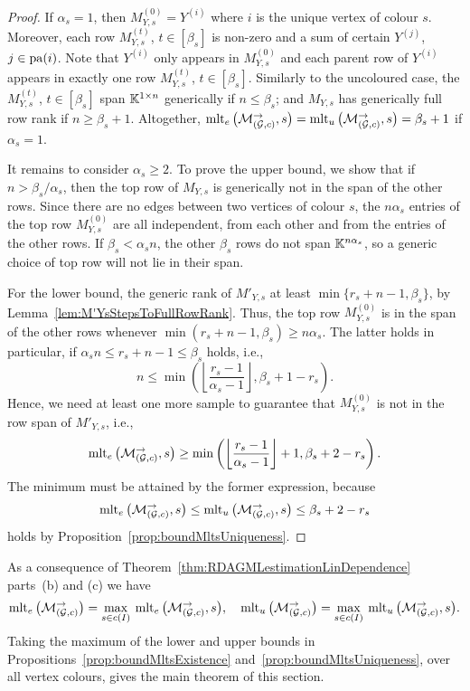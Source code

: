 \begin{proof}
	If $\alpha_s = 1$, then $M_{Y,s}^{(0)} = Y^{(i)}$ where $i$ is the unique vertex of colour $s$. Moreover, each row $M_{Y,s}^{(t)}$, $t \in [\beta_s]$ is non-zero and a sum of certain $Y^{(j)}$, $j \in \operatorname{pa}(i)$. Note that $Y^{(i)}$ only appears in $M_{Y,s}^{(0)}$ and each parent row of $Y^{(i)}$ appears in exactly one row $M_{Y,s}^{(t)}$, $t \in [\beta_s]$. Similarly to the uncoloured case, the $M_{Y,s}^{(t)}$, $t \in [\beta_s]$ span $\mathbb K^{1 \times n}$ generically if $n \leq \beta_s$; and $M_{Y,s}$ has generically full row rank if $n \geq \beta_s +1$. Altogether, $\operatorname{mlt}_e \big(\mathcal{M}_{(\mathcal{G}, c)}^{\to}, s \big) = \operatorname{mlt}_u \big(\mathcal{M}_{(\mathcal{G}, c)}^{\to}, s \big) = \beta_s + 1$ if $\alpha_s = 1$.
	
	It remains to consider $\alpha_s \geq 2$.
	To prove the upper bound, we show that if $n > \beta_s / \alpha_s$, then the top row of $M_{Y,s}$ is generically not in the span of the other rows. Since there are no edges between two vertices of colour $s$, the $n \alpha_s$ entries of the top row $M_{Y,s}^{(0)}$ are all independent, from each other and from the entries of the other rows. If $\beta_s < \alpha_s n$, the other $\beta_s$ rows do not span $\mathbb K^{n \alpha_s}$, so a generic choice of top row will not lie in their span. 
	
	For the lower bound, the generic rank of $M'_{Y,s}$ at least $ \min \{ r_s + n -1 , \beta_s \}$, by Lemma~\ref{lem:M'YsStepsToFullRowRank}. Thus, the top row $M^{(0)}_{Y,s}$ is in the span of the other rows whenever 
	$\min(r_s + n -1, \beta_s) \geq n \alpha_s$. The latter holds in particular, if $\alpha_s n \leq r_s + n - 1 \leq \beta_s$ holds, i.e.,
		\[n \leq \min \left( \left\lfloor\frac{r_s-1}{\alpha_s-1}\right\rfloor , \beta_s + 1 - r_s \right) .	\]
	Hence, we need at least one more sample to guarantee that $M^{(0)}_{Y,s}$ is not in the row span of $M'_{Y,s}$, i.e.,
		\[\operatorname{mlt}_e \big( \mathcal{M}_{(\mathcal{G}, c)}^{\to}, s \big) \geq \min \left( \left\lfloor\frac{r_s-1}{\alpha_s-1}\right\rfloor + 1 , \beta_s + 2 - r_s \right).\]
	The minimum must be attained by the former expression, because
		\[ \operatorname{mlt}_e \big( \mathcal{M}_{(\mathcal{G}, c)}^{\to}, s \big) \leq \operatorname{mlt}_u \big( \mathcal{M}_{(\mathcal{G}, c)}^{\to}, s \big) \leq \beta_s + 2 - r_s \]
	holds by Proposition~\ref{prop:boundMltsUniqueness}.
\end{proof}


As a consequence of Theorem~\ref{thm:RDAGMLestimationLinDependence} parts~(b) and (c) we have
	\[ \operatorname{mlt}_e \big(\mathcal{M}_{(\mathcal{G}, c)}^{\to} \big) = \max_{s \in c(I)} \: \operatorname{mlt}_e \big( \mathcal{M}_{(\mathcal{G}, c)}^{\to}, s \big)
		, \quad
		\operatorname{mlt}_u \big(\mathcal{M}_{(\mathcal{G}, c)}^{\to} \big) = \max_{s \in c(I)} \: \operatorname{mlt}_u \big( \mathcal{M}_{(\mathcal{G}, c)}^{\to}, s \big). \]
Taking the maximum of the lower and upper bounds in Propositions~\ref{prop:boundMltsExistence} and~\ref{prop:boundMltsUniqueness}, over all vertex colours, gives the main theorem of this section.

